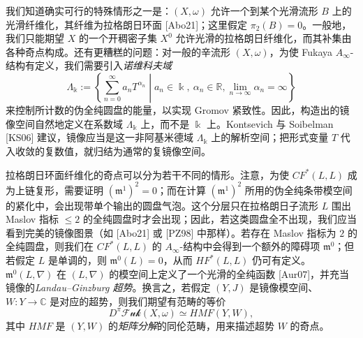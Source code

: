
我们知道确实可行的特殊情形之一是：$(X,\omega)$ 允许一个到某个光滑流形 $B$ 上的光滑纤维化，其纤维为拉格朗日环面 [Abo21]；这里假定 $\pi_2(B)=0$。一般地，我们只能期望 $X$ 的一个开稠密子集 $X^0$ 允许光滑的拉格朗日纤维化，而其补集由各种奇点构成。还有更糟糕的问题：对一般的辛流形 $(X,\omega)$，为使 Fukaya $A_{\infty}$-结构有定义，我们需要引入\emph{诺维科夫域}
\[
  \Lambda_{\Bbbk}:=\left\{\sum_{n=0}^{\infty}a_nT^{\alpha_n}\middle\vert a_n\in\Bbbk,\ \alpha_n\in\mathbb{R},\lim_{n\to\infty}\alpha_n=\infty\right\}
\]
来控制所计数的伪全纯圆盘的能量，以实现 Gromov 紧致性。因此，构造出的镜像空间自然地定义在系数域 $\Lambda_{\Bbbk}$ 上，而不是 $\Bbbk$ 上。Kontsevich 与 Soibelman [KS06] 建议，镜像应当是这一非阿基米德域 $\Lambda_{\Bbbk}$ 上的解析空间；把形式变量 $T$ 代入收敛的复数值，就归结为通常的复镜像空间。


拉格朗日环面纤维化的奇点可以分为若干不同的情形。注意，为使 $CF^{\ast}(L,L)$ 成为上链复形，需要证明 $(\mathfrak{m}^1)^2=0$；而在计算 $(\mathfrak{m}^1)^2$ 所用的伪全纯条带模空间的紧化中，会出现带单个输出的圆盘气泡。这个分层只在拉格朗日子流形 $L$ 围出 Maslov 指标 $\leq 2$ 的全纯圆盘时才会出现；因此，若这类圆盘全不出现，我们应当看到完美的镜像图景（如 [Abo21] 或 [PZ98] 中那样）。若存在 Maslov 指标为 $2$ 的全纯圆盘，则我们在 $CF^{\ast}(L,L)$ 的 $A_{\infty}$-结构中会得到一个额外的障碍项 $\mathfrak{m}^0$；但若假定 $L$ 是单调的，则 $\mathfrak{m}^0(L)=0$，从而 $HF^{\ast}(L,L)$ 仍可有定义。$\mathfrak{m}^0(L,\nabla)$ 在 $(L,\nabla)$ 的模空间上定义了一个光滑的全纯函数 [Aur07]，并充当镜像的\emph{Landau--Ginzburg 超势}。换言之，若假定 $(Y,J)$ 是镜像模空间、$W\colon Y\to\mathbb{C}$ 是对应的超势，则我们期望有范畴的等价
\[
  D^{\pi}\mathcal{Fuk}(X,\omega)\simeq HMF(Y,W),
\]
其中 $HMF$ 是 $(Y,W)$ 的\emph{矩阵分解}的同伦范畴，用来描述超势 $W$ 的奇点。


